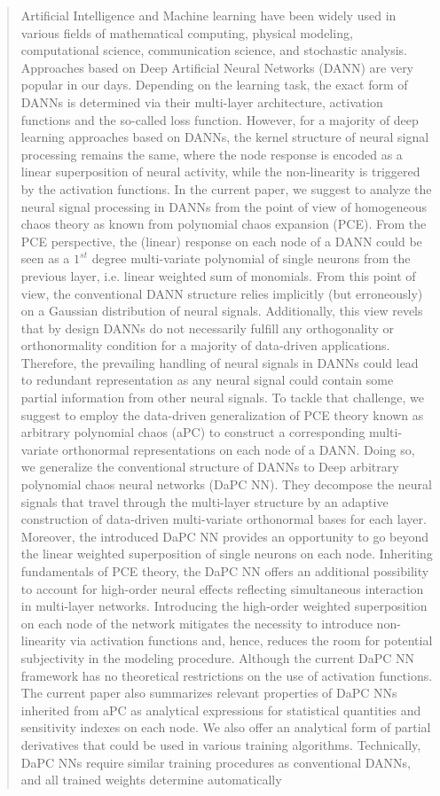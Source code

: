 \documentclass[a4paper,fleqn]{article}
\newcommand{\rw}[1]{\textcolor{blue}{#1}}
\newcommand{\del}[1]{\textcolor{red}{\sout{#1}}}
\renewcommand{\del}[1]{}
\renewcommand{\rw}[1]{#1}
\begin{document}
\begin{abstract}
Artificial Intelligence and Machine learning have been widely used in various fields of mathematical computing, physical modeling, computational science, communication science, and stochastic analysis. Approaches based on Deep Artificial Neural Networks (DANN) are very popular in our days. Depending on the learning task, the exact form of DANNs is determined via their multi-layer architecture, activation functions and the so-called loss function. However, for a majority of deep learning approaches based on DANNs, the kernel structure of neural signal processing remains the same, where the node response is encoded as a linear superposition of \del{neurons} \rw{neural activity}, while the non-linearity is triggered by the activation functions. In the current paper, we suggest to analyze the neural signal processing in DANNs from the point of view of  homogeneous chaos theory as known from polynomial chaos expansion (PCE). From the PCE perspective, the (linear) response on each node of a DANN could be seen as a $1^{st}$ degree multi-variate polynomial of single neurons from the previous layer, i.e. linear weighted sum of monomials. From this point of  view, the conventional DANN structure relies implicitly (but erroneously) on a Gaussian distribution of neural signals. Additionally, this view revels that \rw{by design} DANNs do not necessarily fulfill any orthogonality or orthonormality condition for a majority of data-driven applications. Therefore, the prevailing handling of neural signals in DANNs could lead to redundant representation as any neural signal could contain some partial information from other neural signals. To tackle that challenge, we suggest to employ the data-driven generalization of PCE theory known as arbitrary polynomial chaos (aPC) to construct a corresponding multi-variate orthonormal representations on each node of a DANN. Doing so, we generalize the conventional structure of DANNs to Deep arbitrary polynomial chaos neural networks (DaPC NN). They decompose the neural signals that travel through the multi-layer structure by an adaptive construction of data-driven multi-variate orthonormal bases for each layer.  Moreover, the introduced DaPC NN provides an opportunity to go beyond the linear weighted superposition of single neurons on each node. Inheriting fundamentals of PCE theory, the DaPC NN offers an additional possibility to account for high-order neural effects reflecting simultaneous interaction in multi-layer networks. Introducing the high-order weighted superposition on each node of the network mitigates the necessity to introduce non-linearity via activation functions and, hence, reduces the room for potential subjectivity in the modeling procedure. \rw{Although the current DaPC NN framework has no theoretical restrictions on the use of activation functions}. The current paper also summarizes relevant properties of DaPC NNs inherited from aPC as analytical expressions for statistical quantities and sensitivity indexes on each node. We also offer an analytical form of partial derivatives that could be used in various training algorithms. Technically, DaPC NNs require similar training procedures as conventional DANNs, and all trained weights determine automatically 
\end{abstract}
\end{document}
